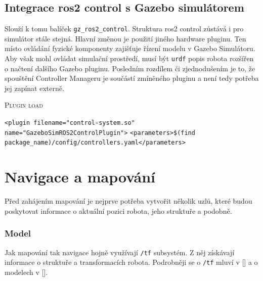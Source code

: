 \subsection*{Integrace ros2 control s Gazebo simulátorem}
Slouží k tomu balíček \verb|gz_ros2_control|. Struktura ros2 control zůstává i pro simulátor stále stejná. Hlavní změnou je použití jiného hardware pluginu. Ten místo ovládání fyzické komponenty zajišťuje řízení modelu v Gazebo Simulátoru. Aby však mohl ovládat simulační prostředí, musí být \verb|urdf| popis robota rozšířen o načtení dalšího Gazebo pluginu. Posledním rozdílem či zjednodušením je to, že spouštění Controller Manageru je součástí zmíněného pluginu a není tedy potřeba jej zapínat externě.

\begin{algorithm}[h!]
	\label{}
	\caption{\textsc{Plugin load}}
	
	\DontPrintSemicolon
	\SetAlgoNoLine
	\SetNlSty{}{}{:}
	\SetNlSkip{-1.1em}
	
	\BlankLine \Indp\Indpp
	
	\texttt{<plugin filename="control-system.so" name="GazeboSimROS2ControlPlugin">}\;
	\Indp
	\texttt{<parameters>\$(find package\_name)/config/controllers.yaml</parameters>}\;
	
\end{algorithm}


\section{Navigace a mapování}


Před zahájením mapování je nejprve potřeba vytvořit několik uzlů, které budou poskytovat informace o aktuální pozici robota, jeho struktuře a podobně.

\subsubsection*{Model}
Jak mapování tak navigace hojně využívají \verb|/tf| subsystém. Z něj získávají informace o struktuře a transformacích robota. Podrobněji se o \verb|/tf| mluví v [] a o modelech v []. 

